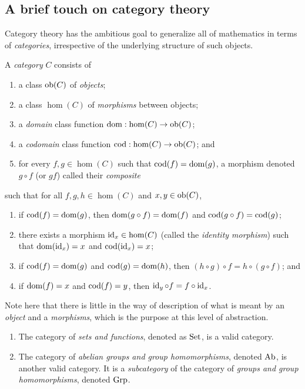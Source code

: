 \subsection{A brief touch on category theory}

Category theory has the ambitious goal to generalize all of mathematics in terms of \emph{categories}, irrespective of the underlying structure of such objects.

\begin{definition}[Category]
    A \emph{category} $C$ consists of
    \begin{enumerate}
        \item a class $\operatorname{ob}(C)$ of \emph{objects};
        \item a class $\hom(C)$ of \emph{morphisms} between objects;
        \item a \emph{domain} class function $\operatorname{dom}: \hom(C) \to \operatorname{ob}(C)$;
        \item a \emph{codomain} class function $\operatorname{cod}: \hom(C) \to \operatorname{ob}(C)$; and
        \item for every $f,g \in \hom(C)$ such that $\operatorname{cod}(f) = \operatorname{dom}(g)$, a morphism denoted $g \circ f$ (or $gf$) called their \emph{composite}
    \end{enumerate}
    such that for all $f, g, h \in \hom(C)$ and $x, y \in \operatorname{ob}(C)$,
    \begin{enumerate}
        \item if $\operatorname{cod}(f) = \operatorname{dom}(g)$, then $\operatorname{dom}(g \circ f) = \operatorname{dom}(f)$ and $\operatorname{cod}(g \circ f) = \operatorname{cod}(g)$;
        \item there exists a morphism $\operatorname{id}_x \in \hom(C)$ (called the \emph{identity morphism}) such that $\operatorname{dom}(\operatorname{id}_x) = x$ and $\operatorname{cod}(\operatorname{id}_x) = x$;
        \item if $\operatorname{cod}(f) = \operatorname{dom}(g)$ and $\operatorname{cod}(g) = \operatorname{dom}(h)$, then $(h \circ g) \circ f = h \circ (g \circ f)$; and
        \item if $\operatorname{dom}(f) = x$ and $\operatorname{cod}(f) = y$, then $\operatorname{id}_y \circ f = f \circ \operatorname{id}_x$.
    \end{enumerate}
\end{definition}

Note here that there is little in the way of description of what is meant by an \emph{object} and a \emph{morphisms}, which is the purpose at this level of abstraction.

\begin{example} \hspace{0em}
    \begin{enumerate}
        \item The category of \emph{sets and functions}, denoted as $\operatorname{Set}$, is a valid category.
        \item The category of \emph{abelian groups and group homomorphisms}, denoted $\operatorname{Ab}$, is another valid category. It is a \emph{subcategory} of the category of \emph{groups and group homomorphisms}, denoted $\operatorname{Grp}$.
    \end{enumerate}
\end{example}

